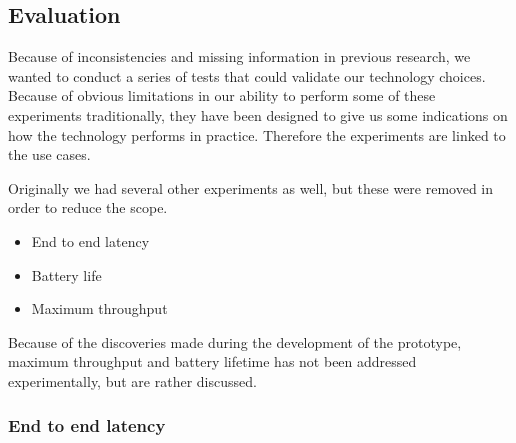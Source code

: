 
\subsection{Evaluation} %
\label{sub:evaluation}

Because of inconsistencies and missing information in previous research, we wanted to conduct a series of tests that could validate our technology choices. Because of obvious limitations in our ability to perform some of these experiments traditionally, they have been designed to give us some indications on how the technology performs in practice. Therefore the experiments are linked to the use cases. 

Originally we had several other experiments as well, but these were removed in order to reduce the scope. 

\begin{itemize}
	\item End to end latency
	\item Battery life
	\item Maximum throughput
\end{itemize}
\noindent
Because of the discoveries made during the development of the prototype, maximum throughput and battery lifetime has not been addressed experimentally, but are rather discussed.

\subsubsection{End to end latency} %
\label{ssub:end_to_end_latency}

